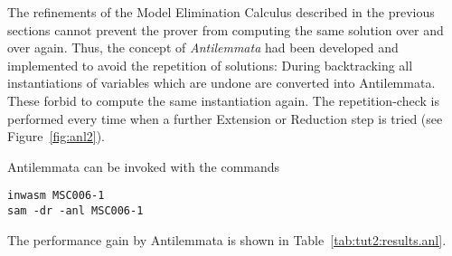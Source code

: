 %
%
%
%

The refinements of the Model Elimination Calculus described in the
previous sections cannot prevent the prover from computing the
same solution over and over again. Thus, the concept of
{\em Antilemmata\/} had been developed and implemented to
avoid the repetition of solutions: 
During backtracking all instantiations of variables which are undone
are converted into
Antilemmata. These forbid to compute the same instantiation again.
The repetition-check is performed every time when a further
Extension or Reduction step is tried (see Figure~\ref{fig:anl2}). 

%

Antilemmata can be invoked with the commands
\begin{center}
\begin{verbatim}
inwasm MSC006-1
sam -dr -anl MSC006-1
\end{verbatim}
\end{center}
The performance gain by Antilemmata is shown in
Table~\ref{tab:tut2:results.anl}. 

